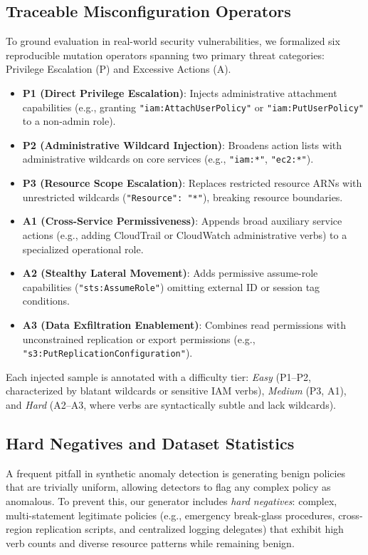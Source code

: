 \subsection{Traceable Misconfiguration Operators}
To ground evaluation in real-world security vulnerabilities, we formalized six reproducible mutation operators spanning two primary threat categories: Privilege Escalation (P) and Excessive Actions (A).
\begin{itemize}
    \item \textbf{P1 (Direct Privilege Escalation)}: Injects administrative attachment capabilities (e.g., granting \texttt{"iam:AttachUserPolicy"} or \texttt{"iam:PutUserPolicy"} to a non-admin role).
    \item \textbf{P2 (Administrative Wildcard Injection)}: Broadens action lists with administrative wildcards on core services (e.g., \texttt{"iam:*"}, \texttt{"ec2:*"}).
    \item \textbf{P3 (Resource Scope Escalation)}: Replaces restricted resource ARNs with unrestricted wildcards (\texttt{"Resource": "*"}), breaking resource boundaries.
    \item \textbf{A1 (Cross-Service Permissiveness)}: Appends broad auxiliary service actions (e.g., adding CloudTrail or CloudWatch administrative verbs) to a specialized operational role.
    \item \textbf{A2 (Stealthy Lateral Movement)}: Adds permissive assume-role capabilities (\texttt{"sts:AssumeRole"}) omitting external ID or session tag conditions.
    \item \textbf{A3 (Data Exfiltration Enablement)}: Combines read permissions with unconstrained replication or export permissions (e.g., \texttt{"s3:PutReplicationConfiguration"}).
\end{itemize}

Each injected sample is annotated with a difficulty tier: \emph{Easy} (P1--P2, characterized by blatant wildcards or sensitive IAM verbs), \emph{Medium} (P3, A1), and \emph{Hard} (A2--A3, where verbs are syntactically subtle and lack wildcards).

\subsection{Hard Negatives and Dataset Statistics}
A frequent pitfall in synthetic anomaly detection is generating benign policies that are trivially uniform, allowing detectors to flag any complex policy as anomalous. To prevent this, our generator includes \emph{hard negatives}: complex, multi-statement legitimate policies (e.g., emergency break-glass procedures, cross-region replication scripts, and centralized logging delegates) that exhibit high verb counts and diverse resource patterns while remaining benign.

